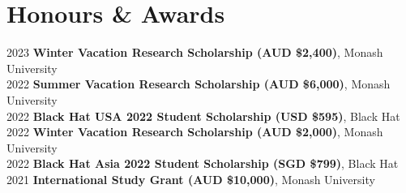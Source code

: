 \section{Honours \& Awards}
\begin{itemize}[leftmargin=0.15in, label={}]
    \small{\item{
            {2023}{ \textbf{Winter Vacation Research Scholarship (AUD \$2,400)}, Monash University} \\
        {2022}{ \textbf{Summer Vacation Research Scholarship (AUD \$6,000)}, Monash University} \\
        {2022}{ \textbf{Black Hat USA 2022 Student Scholarship (USD \$595)}, Black Hat} \\
        {2022}{ \textbf{Winter Vacation Research Scholarship (AUD \$2,000)}, Monash University} \\
        {2022}{ \textbf{Black Hat Asia 2022 Student Scholarship (SGD \$799)}, Black Hat} \\
        {2021}{ \textbf{International Study Grant (AUD \$10,000)}, Monash University} \\
    }}
\end{itemize}
